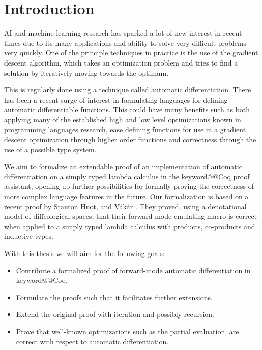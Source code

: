 \documentclass[12pt, final]{article}
\makeatletter
\def\Vakar{V\'{a}k\'{a}r}
\def\<#1>{\csname keyword@@#1\endcsname}
\makeatother
\begin{document}
\newpage

\setcounter{page}{2}
\tableofcontents
\newpage

\section{Introduction}

AI and machine learning research has sparked a lot of new interest in recent times due to its many applications and ability to solve very difficult problems very quickly.
One of the principle techniques in practice is the use of the gradient descent algorithm, which takes an optimization problem and tries to find a solution by iteratively moving towards the optimum.

This is regularly done using a technique called automatic differentiation.
There has been a recent surge of interest in formulating languages for defining automatic differentiable functions.
This could have many benefits such as both applying many of the established high and low level optimizations known in programming languages research, ease defining functions for use in a gradient descent optimization through higher order functions and correctness through the use of a possible type system.

We aim to formalize an extendable proof of an implementation of automatic differentiation on a simply typed lambda calculus in the \<Coq> proof assistant, opening up further possibilities for formally proving the correctness of more complex language features in the future.
Our formalization is based on a recent proof by Stanton Huot, and \Vakar{} \cite{huot2020correctness}.
They proved, using a denotational model of diffeological spaces, that their forward mode emulating macro is correct when applied to a simply typed lambda calculus with products, co-products and inductive types.


With this thesis we will aim for the following goals:
\begin{itemize}
  \item Contribute a formalized proof of forward-mode automatic differentiation in \<Coq>.
  \item Formulate the proofs such that it facilitates further extensions.
  \item Extend the original proof with iteration and possibly recursion.
  \item Prove that well-known optimizations such as the partial evaluation, are correct with respect to automatic differentiation.
\end{itemize}
\end{document}
